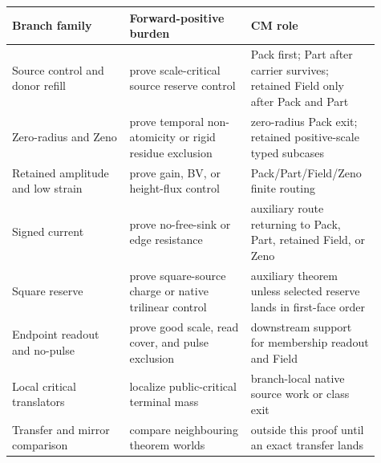 \documentclass[11pt]{article}
\begin{document}
\begin{center}
\small
\begin{tabular}{L{0.30\linewidth}L{0.31\linewidth}L{0.30\linewidth}}
\textbf{Branch family} & \textbf{Forward-positive burden} & \textbf{CM role}\\
\hline
Source control and donor refill & prove scale-critical source reserve control & Pack first; Part after carrier survives; retained Field only after Pack and Part\\
Zero-radius and Zeno & prove temporal non-atomicity or rigid residue exclusion & zero-radius Pack exit; retained positive-scale typed subcases\\
Retained amplitude and low strain & prove gain, BV, or height-flux control & Pack/Part/Field/Zeno finite routing\\
Signed current & prove no-free-sink or edge resistance & auxiliary route returning to Pack, Part, retained Field, or Zeno\\
Square reserve & prove square-source charge or native trilinear control & auxiliary theorem unless selected reserve lands in first-face order\\
Endpoint readout and no-pulse & prove good scale, read cover, and pulse exclusion & downstream support for membership readout and Field\\
Local critical translators & localize public-critical terminal mass & branch-local native source work or class exit\\
Transfer and mirror comparison & compare neighbouring theorem worlds & outside this proof until an exact transfer lands\\
\end{tabular}
\end{center}
\end{document}
